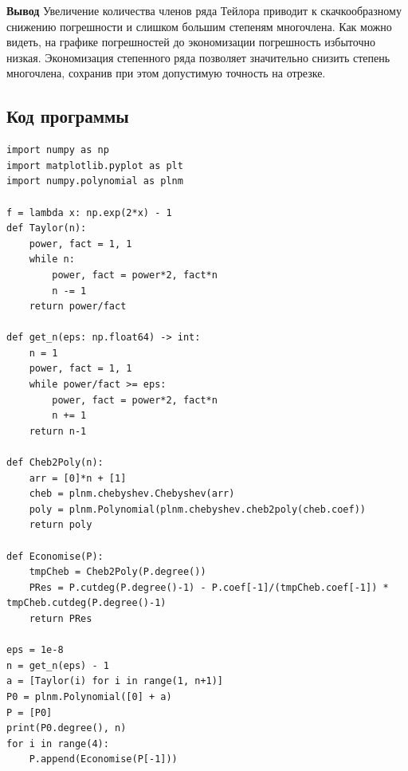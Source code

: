 \textbf{Вывод}{
	Увеличение количества членов ряда Тейлора приводит к скачкообразному снижению погрешности и слишком большим степеням многочлена. Как можно видеть, на графике погрешностей до экономизации погрешность избыточно низкая. Экономизация степенного ряда позволяет значительно снизить степень многочлена, сохранив при этом допустимую точность на отрезке.
}
\subsection*{Код программы}
\begin{lstlisting}
import numpy as np
import matplotlib.pyplot as plt
import numpy.polynomial as plnm

f = lambda x: np.exp(2*x) - 1
def Taylor(n):
    power, fact = 1, 1
    while n:
        power, fact = power*2, fact*n
        n -= 1
    return power/fact

def get_n(eps: np.float64) -> int:
    n = 1
    power, fact = 1, 1
    while power/fact >= eps:
        power, fact = power*2, fact*n
        n += 1
    return n-1

def Cheb2Poly(n):
    arr = [0]*n + [1]
    cheb = plnm.chebyshev.Chebyshev(arr)
    poly = plnm.Polynomial(plnm.chebyshev.cheb2poly(cheb.coef))
    return poly

def Economise(P):
    tmpCheb = Cheb2Poly(P.degree())
    PRes = P.cutdeg(P.degree()-1) - P.coef[-1]/(tmpCheb.coef[-1]) * tmpCheb.cutdeg(P.degree()-1)
    return PRes

eps = 1e-8
n = get_n(eps) - 1
a = [Taylor(i) for i in range(1, n+1)]
P0 = plnm.Polynomial([0] + a)
P = [P0]
print(P0.degree(), n)
for i in range(4):
    P.append(Economise(P[-1]))

\end{lstlisting}
